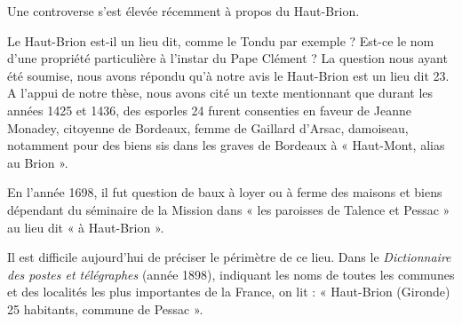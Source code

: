 \asterism{}

Une controverse s'est élevée récemment à propos du Haut-Brion.

Le Haut-Brion est-il un lieu dit, comme le Tondu par exemple ? Est-ce le nom d'une propriété particulière à l'instar du Pape Clément ? La question nous ayant été soumise, nous avons répondu qu'à notre avis le Haut-Brion est un lieu dit 23. A l'appui de notre thèse, nous avons cité un texte mentionnant que durant les années 1425 et 1436, des esporles 24 furent consenties en faveur de Jeanne Monadey, citoyenne de Bordeaux, femme de Gaillard d'Arsac, damoiseau, notamment pour des biens sis dans les graves de Bordeaux à « Haut-Mont, alias au Brion ».

En l'année 1698, il fut question de baux à loyer ou à ferme des maisons et biens dépendant du séminaire de la Mission dans « les paroisses de Talence et Pessac » au lieu dit « à Haut-Brion ».

Il est difficile aujourd'hui de préciser le périmètre de ce lieu. Dans le \textit{Dictionnaire des postes et télégraphes} (année 1898), indiquant les noms de toutes les communes et des localités les plus importantes de la France, on lit : « Haut-Brion (Gironde) 25 habitants, commune de Pessac ».

